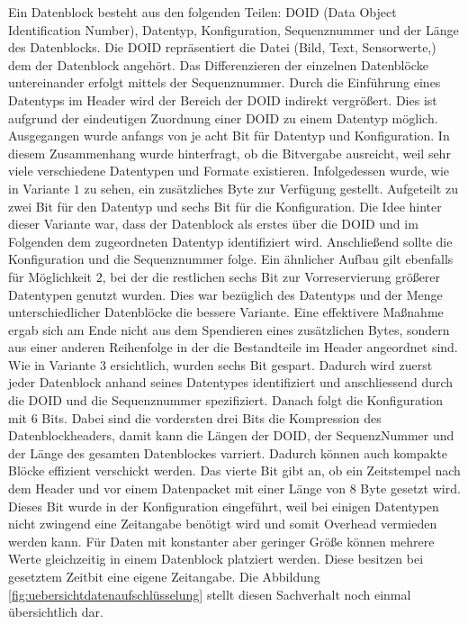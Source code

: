 Ein Datenblock besteht aus den folgenden Teilen: DOID (Data Object
Identification Number), Datentyp, Konfiguration, Sequenznummer und der Länge des
Datenblocks. Die DOID repräsentiert die Datei (Bild, Text, Sensorwerte,\etc)
dem der Datenblock angehört. Das Differenzieren der einzelnen Datenblöcke
untereinander erfolgt mittels der Sequenznummer. Durch die Einführung eines
Datentyps im Header wird der Bereich der DOID indirekt vergrößert. Dies
ist aufgrund der eindeutigen Zuordnung einer DOID zu einem Datentyp möglich.
\newline
Ausgegangen wurde anfangs von je acht Bit für Datentyp und Konfiguration.
In diesem Zusammenhang wurde hinterfragt, ob die Bitvergabe ausreicht,
weil sehr viele verschiedene Datentypen und Formate existieren. Infolgedessen
wurde, wie in Variante $1$ zu sehen, ein zusätzliches Byte zur Verfügung
gestellt. Aufgeteilt zu zwei Bit für den Datentyp und sechs Bit für die
Konfiguration. Die Idee hinter dieser Variante war, dass der Datenblock als
erstes über die DOID und im Folgenden dem zugeordneten Datentyp identifiziert
wird. Anschließend sollte die Konfiguration und die Sequenznummer folge.
Ein ähnlicher Aufbau gilt ebenfalls für Möglichkeit $2$, bei der die restlichen
sechs Bit zur Vorreservierung größerer Datentypen genutzt wurden. Dies war
bezüglich des Datentyps und der Menge unterschiedlicher Datenblöcke die bessere
Variante. Eine effektivere Maßnahme ergab sich am Ende nicht aus dem
Spendieren eines zusätzlichen Bytes, sondern aus einer anderen Reihenfolge in
der die Bestandteile im Header angeordnet sind. Wie in Variante $3$ ersichtlich,
wurden sechs Bit gespart. Dadurch wird zuerst jeder Datenblock anhand
seines Datentypes identifiziert und anschliessend durch die DOID und die
Sequenznummer spezifiziert. Danach folgt die Konfiguration mit $6$ Bits.
Dabei sind die vordersten drei Bits die Kompression des Datenblockheaders, damit
kann die Längen der DOID, der SequenzNummer und der Länge des gesamten
Datenblockes varriert. Dadurch können auch kompakte Blöcke effizient verschickt
werden.
Das vierte Bit gibt an, ob ein Zeitstempel nach dem Header und vor einem
Datenpacket mit einer Länge von $8$ Byte gesetzt wird.
Dieses Bit wurde in der Konfiguration eingeführt, weil bei einigen Datentypen
nicht zwingend eine Zeitangabe benötigt wird und somit Overhead vermieden
werden kann. Für Daten mit konstanter aber geringer Größe können mehrere Werte
gleichzeitig in einem Datenblock platziert werden. Diese besitzen bei
gesetztem Zeitbit eine eigene Zeitangabe. Die Abbildung
\ref{fig:uebersichtdatenaufschlüsselung} stellt diesen Sachverhalt noch einmal
übersichtlich dar.


